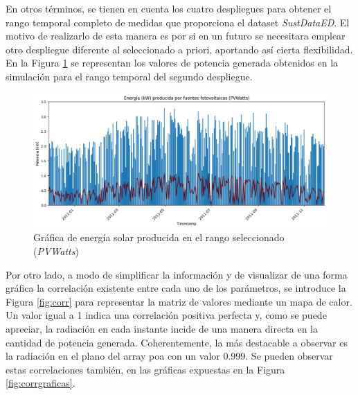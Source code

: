\vspace{3mm}

En otros términos, se tienen en cuenta los cuatro despliegues para obtener el rango temporal completo de medidas que proporciona el dataset \textit{SustDataED}. El motivo de realizarlo de esta manera es por si en un futuro se necesitara emplear otro despliegue diferente al seleccionado a priori, aportando así cierta flexibilidad. En la Figura \ref{fig:solaryearpv} se representan los valores de potencia generada obtenidos en la simulación para el rango temporal del segundo despliegue.

\vspace{3mm}

\begin{figure}[H]
  \centering
  \includegraphics[width=1\textwidth]{img/diseno/matplotsolaryearpvwatts.png}
  \caption{Gráfica de energía solar producida en el rango seleccionado (\textit{PVWatts})}
  \label{fig:solaryearpv}
\end{figure}

\vspace{3mm}

Por otro lado, a modo de simplificar la información y de visualizar de una forma gráfica la correlación existente entre cada uno de los parámetros, se introduce la Figura \ref{fig:corr} para representar la matriz de valores mediante un mapa de calor. Un valor igual a 1 indica una correlación positiva perfecta y, como se puede apreciar, la radiación en cada instante incide de una manera directa en la cantidad de potencia generada. Coherentemente, la más destacable a observar es la radiación en el plano del array \gls{poa} con un valor 0.999. Se pueden observar estas correlaciones también, en las gráficas expuestas en la Figura \ref{fig:corrgraficas}.

\vspace{3mm}

